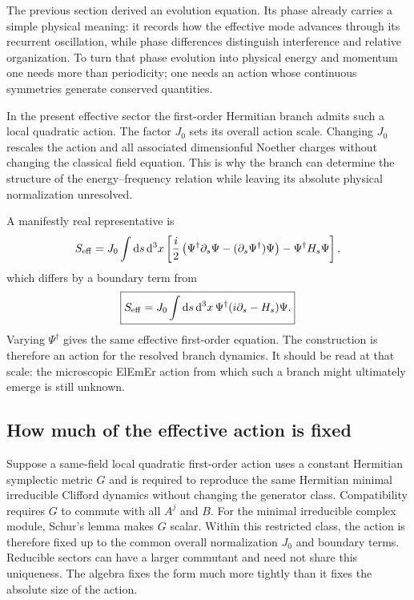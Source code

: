 \documentclass[11pt]{article}
\theoremstyle{definition}
\newcommand{\ElEmEr}{\mbox{ElEmEr}}
\newcommand{\dd}{\mathrm{d}}
\begin{document}
The previous section derived an evolution equation.  Its phase already carries a simple
physical meaning: it records how the effective mode advances through its recurrent oscillation,
while phase differences distinguish interference and relative organization.  To turn that
phase evolution into physical energy and momentum one needs more than periodicity; one needs an
action whose continuous symmetries generate conserved quantities.

In the present effective sector the first-order Hermitian branch admits such a local quadratic
action.  The factor $J_0$ sets its overall action scale.  Changing $J_0$ rescales the action and
all associated dimensionful Noether charges without changing the classical field equation.
This is why the branch can determine the structure of the energy--frequency relation while
leaving its absolute physical normalization unresolved.

A manifestly real representative is
\begin{equation}
 S_{\rm eff}=J_0\int\dd s\,\dd^3x\left[
 \frac{i}{2}\left(\Psi^\dagger\partial_s\Psi
 -(\partial_s\Psi^\dagger)\Psi\right)
 -\Psi^\dagger H_s\Psi\right],
 \label{eq:Seffreal}
\end{equation}
which differs by a boundary term from
\begin{equation}
 \boxed{
 S_{\rm eff}=J_0\int\dd s\,\dd^3x\,
 \Psi^\dagger(i\partial_s-H_s)\Psi.}
 \label{eq:Seff}
\end{equation}
Varying $\Psi^\dagger$ gives the same effective first-order equation.  The construction is
therefore an action for the resolved branch dynamics.  It should be read at that scale: the
microscopic \ElEmEr{} action from which such a branch might ultimately emerge is still
unknown.

\subsection{How much of the effective action is fixed}

Suppose a same-field local quadratic first-order action uses a constant Hermitian symplectic
metric $G$ and is required to reproduce the same Hermitian minimal irreducible Clifford
dynamics without changing the generator class.  Compatibility requires $G$ to commute with
all $A^j$ and $B$.  For the minimal irreducible complex module, Schur's lemma makes $G$
scalar.  Within this restricted class, the action is therefore fixed up to the common overall
normalization $J_0$ and boundary terms.  Reducible sectors can have a larger commutant and need
not share this uniqueness.  The algebra fixes the form much more tightly than it fixes the
absolute size of the action.
\end{document}
